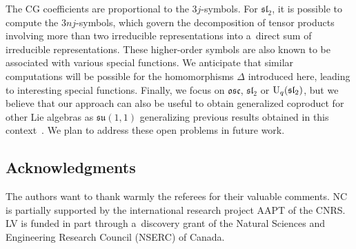 \documentclass[pdftex]{sigma}
\numberwithin{equation}{section}
\theoremstyle{definition}
\begin{document}
The CG coefficients are proportional to the $3j$-symbols. For $\mathfrak{sl}_2$, it is possible to compute the $3nj$-symbols, which govern the decomposition of tensor products involving more than two irreducible representations into a~direct sum of irreducible representations. These higher-order symbols are also known to be associated with various special functions. We anticipate that similar computations will be possible for the homomorphisms $\Delta$ introduced here, leading to interesting special functions.
Finally, we focus on $\mathfrak{osc}$, $\mathfrak{sl}_2$ or ${\rm U}_q(\mathfrak{sl}_2)$, but we believe that our approach can also be useful to obtain generalized coproduct for other Lie algebras as $\mathfrak{su}(1,1)$ generalizing previous results obtained in this context~\cite{Alvarez}.
We plan to address these open problems in future work.

\subsection*{Acknowledgments} The authors want to thank warmly the referees for their valuable comments.
NC is partially supported by the international research project AAPT of the CNRS.
 LV is funded in part through a~discovery grant of the Natural Sciences and Engineering Research Council (NSERC) of Canada.
\end{document}
